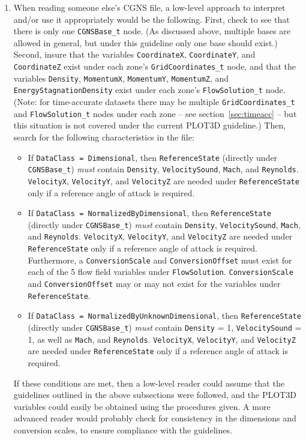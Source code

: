 \documentclass[12pt]{article}
\begin{document}
\begin{enumerate}
\item When reading someone else's CGNS file, a low-level
approach to interpret and/or use it
appropriately would be the following.  First, check to see that there
is only one {\tt CGNSBase\_t} node.  (As discussed above, multiple bases
are allowed in general, but under this guideline only one base should exist.)
Second, insure that the variables {\tt CoordinateX}, {\tt CoordinateY},
and {\tt CoordinateZ} exist under each zone's {\tt GridCoordinates\_t} node,
and that the variables {\tt Density}, {\tt MomentumX}, {\tt MomentumY},
{\tt MomentumZ}, and {\tt EnergyStagnationDensity} exist under each 
zone's {\tt FlowSolution\_t} node.  (Note:  for time-accurate datasets
there may be multiple {\tt GridCoordinates\_t} and 
{\tt FlowSolution\_t} nodes under each 
zone -- see section~\ref{sec:timeacc} -- but this situation is not
covered under the current PLOT3D guideline.)  Then, search for the following 
characteristics in the file:

\begin{itemize}
\item If {\tt DataClass = Dimensional}, then {\tt ReferenceState}
(directly under {\tt CGNSBase\_t}) {\it must} contain {\tt Density},
{\tt VelocitySound}, {\tt Mach}, and {\tt Reynolds}.  {\tt VelocityX},
{\tt VelocityY}, and {\tt VelocityZ} are needed under {\tt ReferenceState} only if a reference
angle of attack is required.

\item If {\tt DataClass = NormalizedByDimensional}, then {\tt ReferenceState}
(directly under {\tt CGNSBase\_t}) {\it must} contain {\tt Density},
{\tt VelocitySound}, {\tt Mach}, and {\tt Reynolds}.  {\tt VelocityX},
{\tt VelocityY}, and {\tt VelocityZ} are needed under {\tt ReferenceState} only if a reference
angle of attack is required.  Furthermore, a
{\tt ConversionScale} and {\tt ConversionOffset}
must exist for each of the 5 flow field variables
under {\tt FlowSolution}.  {\tt ConversionScale} and {\tt ConversionOffset}
may or may not exist for the variables under {\tt ReferenceState}.

\item If {\tt DataClass = NormalizedByUnknownDimensional},
then {\tt ReferenceState} (directly under {\tt CGNSBase\_t}) {\it must}
contain {\tt Density} = 1, {\tt VelocitySound} = 1, as well as
{\tt Mach}, and {\tt Reynolds}.  {\tt VelocityX},
{\tt VelocityY}, and {\tt VelocityZ} are needed under {\tt ReferenceState} only if a reference
angle of attack is required.

\end{itemize}

\noindent If these conditions are met, then a low-level
reader could assume that the guidelines outlined in the above 
subsections were
followed, and the PLOT3D variables could easily be obtained
using the procedures given.  A more advanced reader would
probably check for consistency in the dimensions and conversion
scales, to ensure compliance with the guidelines.  \label{Itemnote5}

\end{enumerate}
\end{document}
